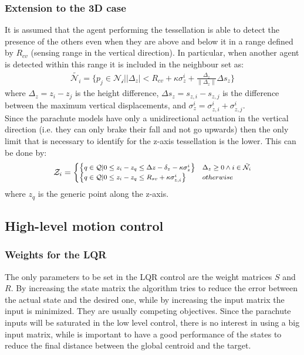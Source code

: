     \subsubsection{Extension to the 3D case}  
    It is assumed that the agent performing the tessellation is able to detect the presence of the others even when they are above and below it in a range defined by $R_{cv}$ (sensing range in the vertical direction). In particular, when another agent is detected within this range it is included in the neighbour set as:
    \begin{gather}
        \tilde{\mathcal{N}_i} = \{p_j \in \mathcal{N_i} \lvert \lvert \Delta_z \lvert < R_{cv} + \kappa \sigma_z^i
        + \frac{\Delta_z}{\lVert \Delta_z \lVert }\Delta s_z\} %
        \label{eq:neighbour_set_voronoi}
    \end{gather}
    where $\Delta_z=z_i - z_j$ is the height difference, $\Delta s_z = s_{z, i} - s_{z,j}$ is the difference between the maximum vertical displacements, and $\sigma_z^i=\sigma_{z,i}^i + \sigma_{z, j}^i$.\\
    Since the parachute models have only a unidirectional actuation in the vertical direction (i.e. they can only brake their fall and not go upwards) then the only limit that is necessary to identify for the z-axis tessellation is the lower. This can be done by:
    \begin{equation}
    {\scriptsize
        \mathcal{Z}_i = 
        \begin{cases}
            \left\{q\in \mathcal{Q} \lvert 0 \le z_i-z_q \le \Delta z - \delta_z - \kappa \sigma_z^i \right\}& \Delta_z \ge 0 \wedge i \in \tilde{\mathcal{N}_i} \\
            \left\{q \in \mathcal{Q} \lvert 0 \le z_i-z_q
            \le R_{sv} + \kappa \sigma_{z, i}^i \right\} & otherwise
        \end{cases}   } 
    \end{equation}
    where $z_q$ is the generic point along the z-axis.
   
\subsection{High-level motion control}\label{sec:details_high_level}
\subsubsection{Weights for the LQR}
The only parameters to be set in the LQR control are the weight matrices $S$ and $R$. By increasing the state matrix the algorithm tries to reduce the error between the actual state and the desired one, while by increasing the input matrix the input is minimized. They are usually competing objectives. Since the parachute inputs will be saturated in the low level control, there is no interest in using a big input matrix, while is important to have a good performance of the states to reduce the final distance between the global centroid and the target.
